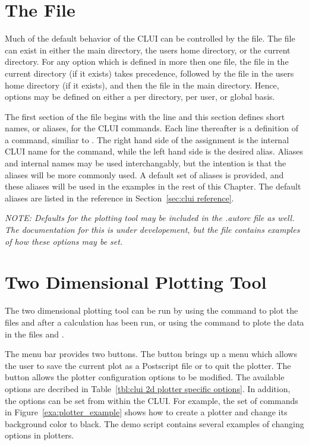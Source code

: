 \section{ The  File }

Much of the default behavior of the \AUTOc CLUI
can be controlled by the  file.
The  file can exist in
either the main \AUTOc directory, the users
home directory, or the current directory.  For any
option which is defined in more then one file, 
the  file
in the current directory (if it exists) takes precedence, 
followed by the  file
in the users home directory (if it exists), and then the
 file in the main \AUTOc directory.  Hence, 
options may be defined on either a per directory, per
user, or global basis.  

The first section of the  file
begins with the line 
and this section defines short names, or aliases,
for the \AUTOc CLUI commands.  
Each line thereafter is a definition of
a command, similiar to 
.
The right hand side of the assignment
is the internal \AUTOc CLUI name for the command,
while the left hand side is the desired alias.  
Aliases and
internal names may be used interchangably, but the
intention is that the aliases will be more commonly
used.  A default set of aliases is provided, and
these aliases will be used in the examples in the
rest of this Chapter.  The default aliases
are listed in the reference in Section~\ref{sec:clui reference}.

{\em NOTE:  Defaults for the plotting tool may be included in
the .autorc file as well.  The documentation for this
is under developement, but the file 
contains examples of how these options may be set.}

\section{Two Dimensional Plotting Tool}\label{clui:2d plotting}

The two dimensional plotting tool can be run by using the command
 to plot the files  and 
after a calculation has been run, or using the command
 to plote the data in the
files  and .  

The menu bar provides two buttons.  The 
button brings up a menu which allows the user to save
the current plot as a Postscript file or
to quit the plotter.
The  button allows the plotter
configuration options to be modified.
The available options are decribed in
Table~\ref{tbl:clui 2d plotter specific options}.  In addition, the options can 
be set from within the CLUI.  For example,
the set of commands in Figure~\ref{exa:plotter_example} shows how to
create a plotter and change its background color to black.  The
demo script  contains several
examples of changing options in plotters.

